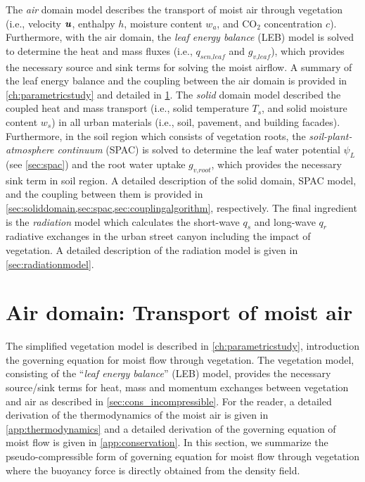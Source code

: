 The \textit{air} domain model describes the transport of moist air through vegetation (i.e., velocity $\textbf{\textit{u}}$, enthalpy $h$, moisture content $w_a$, and CO$_2$ concentration $c$). Furthermore, with the air domain, the \textit{leaf energy balance} (LEB) model is solved to determine the heat and mass fluxes (i.e., $q_{\textit{sen,leaf}}$ and $g_{\textit{v,leaf}}$), which provides the necessary source and sink terms for solving the moist airflow. A summary of the leaf energy balance and the coupling between the air domain is provided in \cref{ch:parametricstudy} and detailed in \cref{sec:airdomain}. The \textit{solid} domain model described the coupled heat and mass transport (i.e., solid temperature $T_s$, and solid moisture content $w_s$) in all urban materials (i.e., soil, pavement, and building facades). Furthermore, in the soil region which consists of vegetation roots, the \textit{soil-plant-atmosphere continuum} (SPAC) is solved to determine the leaf water potential $\psi_L$ (see \cref{sec:spac}) and the root water uptake $g_{\textit{v,root}}$, which provides the necessary sink term in soil region. A detailed description of the solid domain, SPAC model, and the coupling between them is provided in \cref{sec:soliddomain,sec:spac,sec:couplingalgorithm}, respectively. The final ingredient is the \textit{radiation} model which calculates the short-wave $q_s$ and long-wave $q_r$ radiative exchanges in the urban street canyon including the impact of vegetation. A detailed description of the radiation model is given in \cref{sec:radiationmodel}.

\section{Air domain: Transport of moist air}
\label{sec:airdomain}
The simplified vegetation model is described in \cref{ch:parametricstudy}, introduction the governing equation for moist flow through vegetation. The vegetation model, consisting of the ``\textit{leaf energy balance}'' (LEB) model, provides the necessary source/sink terms for heat, mass and momentum exchanges between vegetation and air as described in \cref{sec:cons_incompressible}. For the reader, a detailed derivation of the thermodynamics of the moist air is given in \cref{app:thermodynamics} and a detailed derivation of the governing equation of moist flow is given in \cref{app:conservation}. In this section, we summarize the pseudo-compressible form of governing equation for moist flow through vegetation where the buoyancy force is directly obtained from the density field.  


